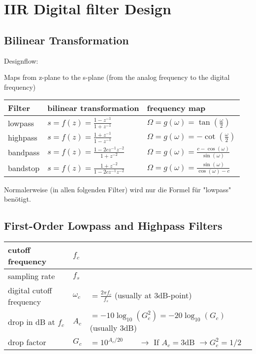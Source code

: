 \section{IIR Digital filter Design}
\subsection{Bilinear Transformation}
Designflow:
\begin{center}

\end{center}
Maps from z-plane to the s-plane (from the analog frequency to the digital
frequency)

\begin{tabularx}{\textwidth}{|l|X|X|}
	\hline
	\textbf{Filter} & \textbf{bilinear transformation} & \textbf{frequency map}
	\\ \hline
	lowpass & 
	$s = f(z) = \frac{1 - z^{-1}}{1 + z^{-1}}$ &
	$ \Omega = g(\omega) = \tan(\frac{\omega}{2})$
	\\ \hline
	highpass & 
	$s = f(z) = \frac{1 + z^{-1}}{1 - z^{-1}}$ &
	$ \Omega = g(\omega) = - \cot(\frac{\omega}{2})$
	\\ \hline
	bandpass & 
	$s = f(z) = \frac{1 - 2cz^{-1} z^{-2}}{1 + z^{-2}}$ &
	$ \Omega = g(\omega) = \frac{c - \cos(\omega)}{\sin(\omega)}$
	\\ \hline
	bandstop & 
	$s = f(z) = \frac{1 + z^{-2}}{1 - 2cz^{-1} z^{-2}}$ &
	$ \Omega = g(\omega) = \frac{\sin(\omega)}{\cos(\omega) - c}$ 
	\\ \hline
\end{tabularx}

Normalerweise (in allen folgenden Filter) wird nur die Formel für "lowpass" benötigt. 

\subsection{First-Order Lowpass and Highpass Filters}
\begin{tabular}{|l|l|l|}
	\hline
	cutoff frequency & $f_c$ &
	\\ \hline
	sampling rate & $f_s$ &
	\\ \hline
	digital cutoff frequency & $\omega_c$ & $ = \frac{2\pi f_c}{f_s}$ \qquad (usually at 3dB-point)
	\\ \hline
	drop in dB at $f_c$ & $A_c$ & $= -10\log_{10}(G_c^2) = -20\log_{10}(G_c)$ \qquad (usually 3dB)
	\\ \hline
	drop factor & $G_c$ & $=10^{A_c/20} \qquad \longrightarrow $ If $A_c = 3$dB $\rightarrow G_c^2 = 1/2$
	\\ \hline
\end{tabular}

